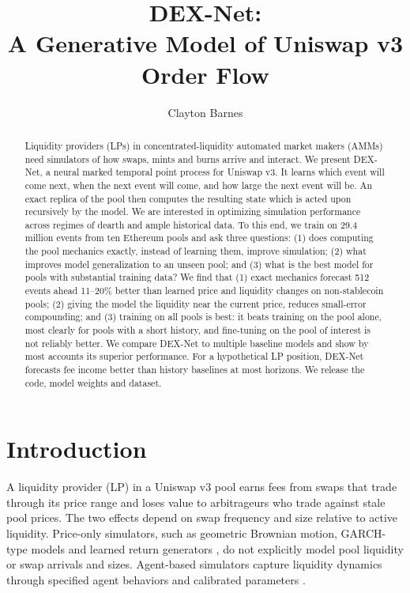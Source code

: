 \documentclass[11pt]{article}
\title{DEX-Net:\\ A Generative Model of Uniswap v3 Order Flow}
\author{Clayton Barnes}
\date{}
\begin{document}
\maketitle

\begin{abstract}
Liquidity providers (LPs) in concentrated-liquidity automated market makers (AMMs) need simulators of how swaps, mints and burns arrive and interact. We present DEX-Net, a neural marked temporal point process for Uniswap v3. It learns which event will come next, when the next event will come, and how large the next event will be. An exact replica of the pool then computes the resulting state which is acted upon recursively by the model. We are interested in optimizing simulation performance across regimes of dearth and ample historical data. To this end, we train on 29.4 million events from ten Ethereum pools and ask three questions: (1) does computing the pool mechanics exactly, instead of learning them, improve simulation; (2) what improves model generalization to an unseen pool; and (3) what is the best model for pools with substantial training data? We find that (1) exact mechanics forecast 512 events ahead 11--20\% better than learned price and liquidity changes on non-stablecoin pools; (2) giving the model the liquidity near the current price, reduces small-error compounding; and (3) training on all pools is best: it beats training on the pool alone, most clearly for pools with a short history, and fine-tuning on the pool of interest is not reliably better. We compare DEX-Net to multiple baseline models and show by most accounts its superior performance. For a hypothetical LP position, DEX-Net forecasts fee income better than history baselines at most horizons. We release the code, model weights and dataset.
\end{abstract}

\section{Introduction}

A liquidity provider (LP) in a Uniswap v3 pool earns fees from swaps that trade through its price range and loses value to arbitrageurs who trade against stale pool prices. The two effects depend on swap frequency and size relative to active liquidity. Price-only simulators, such as geometric Brownian motion, GARCH-type models \citep{bollerslev1986garch} and learned return generators \citep{wiese2020quantgans}, do not explicitly model pool liquidity or swap arrivals and sizes. Agent-based simulators capture liquidity dynamics through specified agent behaviors and calibrated parameters \citep{angeris2021analysis,dinosse2026dynamic}.
\end{document}
